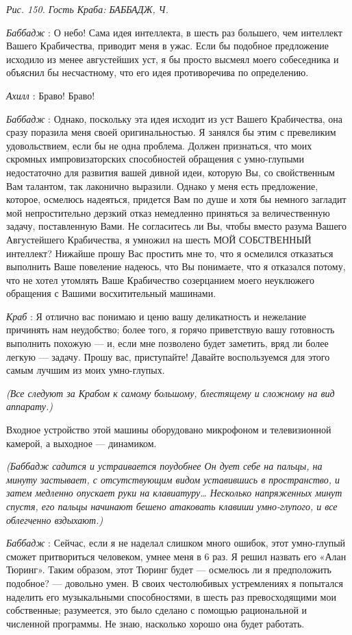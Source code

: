 \documentclass[../main.tex]{subfiles}
\begin{document}
\begin{dialogue}
\emph{Рис. 150. Гость Краба: БАББАДЖ, Ч.}

\emph{Баббадж} : О небо! Сама идея интеллекта, в шесть раз большего, чем интеллект Вашего Крабичества, приводит меня в ужас. Если бы подобное предложение исходило из менее августейших уст, я бы просто высмеял моего собеседника и объяснил бы несчастному, что его идея противоречива по определению.

\emph{Ахилл} : Браво! Браво!

\emph{Баббадж} : Однако, поскольку эта идея исходит из уст Вашего Крабичества, она сразу поразила меня своей оригинальностью. Я занялся бы этим с превеликим удовольствием, если бы не одна проблема. Должен признаться, что моих скромных импровизаторских способностей обращения с умно-глупыми недостаточно для развития вашей дивной идеи, которую Вы, со свойственным Вам талантом, так лаконично выразили. Однако у меня есть предложение, которое, осмелюсь надеяться, придется Вам по душе и хотя бы немного загладит мой непростительно дерзкий отказ немедленно приняться за величественную задачу, поставленную Вами. Не согласитесь ли Вы, чтобы вместо разума Вашего Августейшего Крабичества, я умножил на шесть МОЙ СОБСТВЕННЫЙ интеллект? Нижайше прошу Вас простить мне то, что я осмелился отказаться выполнить Ваше повеление надеюсь, что Вы понимаете, что я отказался потому, что не хотел утомлять Ваше Крабичество созерцанием моего неуклюжего обращения с Вашими восхитительный машинами.

\emph{Краб} : Я отлично вас понимаю и ценю вашу деликатность и нежелание причинять нам неудобство; более того, я горячо приветствую вашу готовность выполнить похожую --- и, если мне позволено будет заметить, вряд ли более легкую --- задачу. Прошу вас, приступайте! Давайте воспользуемся для этого самым лучшим из моих умно-глупых.

\emph{(Все следуют за Крабом к самому большому, блестящему и сложному на вид аппарату.)}

Входное устройство этой машины оборудовано микрофоном и телевизионной камерой, а выходное --- динамиком.

\emph{(Баббадж садится и устраивается поудобнее Он дует себе на пальцы, на минуту застывает, с отсутствующим видом уставившись в пространство, и затем медленно опускает руки на клавиатуру\ldots{} Несколько напряженных минут спустя, его пальцы начинают бешено атаковать клавиши умно-глупого, и все облегченно вздыхают.)}

\emph{Баббадж} : Сейчас, если я не наделал слишком много ошибок, этот умно-глупый сможет притвориться человеком, умнее меня в 6 раз. Я решил назвать его «Алан Тюринг». Таким образом, этот Тюринг будет --- осмелюсь ли я предположить подобное? --- довольно умен. В своих честолюбивых устремлениях я попытался наделить его музыкальными способностями, в шесть раз превосходящими мои собственные; разумеется, это было сделано с помощью рациональной и численной программы. Не знаю, насколько хорошо она будет работать.


\end{dialogue}
\end{document}
